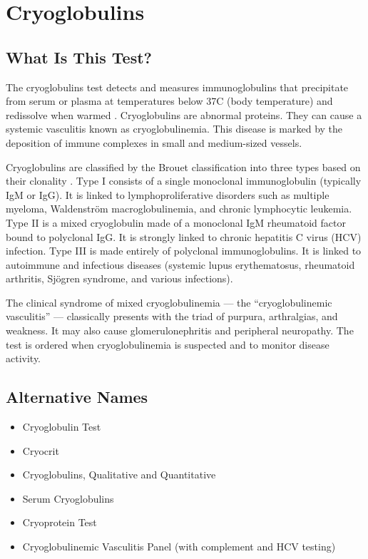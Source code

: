 \chapter{Cryoglobulins}

\section*{What Is This Test?}
The cryoglobulins test detects and measures immunoglobulins that precipitate from serum or plasma at temperatures below 37\textdegree{}C (body temperature) and redissolve when warmed \cite{kaushansky2021williams}. Cryoglobulins are abnormal proteins. They can cause a systemic vasculitis known as cryoglobulinemia. This disease is marked by the deposition of immune complexes in small and medium-sized vessels.

Cryoglobulins are classified by the Brouet classification into three types based on their clonality \cite{brouet1974biologic}. Type I consists of a single monoclonal immunoglobulin (typically IgM or IgG). It is linked to lymphoproliferative disorders such as multiple myeloma, Waldenstr\"om macroglobulinemia, and chronic lymphocytic leukemia. Type II is a mixed cryoglobulin made of a monoclonal IgM rheumatoid factor bound to polyclonal IgG. It is strongly linked to chronic hepatitis C virus (HCV) infection. Type III is made entirely of polyclonal immunoglobulins. It is linked to autoimmune and infectious diseases (systemic lupus erythematosus, rheumatoid arthritis, Sj\"ogren syndrome, and various infections).

The clinical syndrome of mixed cryoglobulinemia --- the ``cryoglobulinemic vasculitis'' --- classically presents with the triad of purpura, arthralgias, and weakness. It may also cause glomerulonephritis and peripheral neuropathy. The test is ordered when cryoglobulinemia is suspected and to monitor disease activity.

\section*{Alternative Names}
\begin{itemize}
  \item Cryoglobulin Test
  \item Cryocrit
  \item Cryoglobulins, Qualitative and Quantitative
  \item Serum Cryoglobulins
  \item Cryoprotein Test
  \item Cryoglobulinemic Vasculitis Panel (with complement and HCV testing)
\end{itemize}
